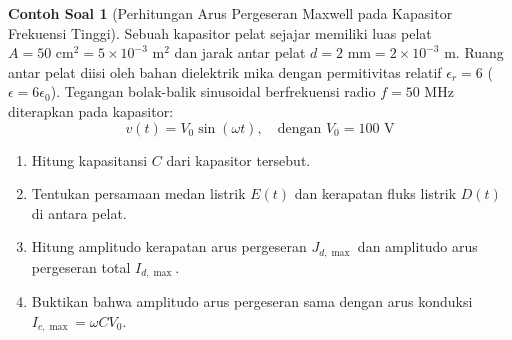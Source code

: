 \documentclass[11pt,a4paper]{article}
\theoremstyle{definition}
\newtheorem{example}{Contoh Soal}[section]
\begin{document}
\begin{example}[Perhitungan Arus Pergeseran Maxwell pada Kapasitor Frekuensi Tinggi]
Sebuah kapasitor pelat sejajar memiliki luas pelat $A = 50\text{ cm}^2 = 5 \times 10^{-3}\text{ m}^2$ dan jarak antar pelat $d = 2\text{ mm} = 2 \times 10^{-3}\text{ m}$. Ruang antar pelat diisi oleh bahan dielektrik mika dengan permitivitas relatif $\epsilon_r = 6$ ($\epsilon = 6 \epsilon_0$).
Tegangan bolak-balik sinusoidal berfrekuensi radio $f = 50\text{ MHz}$ diterapkan pada kapasitor:
\begin{equation*}
    v(t) = V_0 \sin(\omega t), \quad \text{dengan } V_0 = 100\text{ V}
\end{equation*}
\begin{enumerate}[leftmargin=*]
    \item Hitung kapasitansi $C$ dari kapasitor tersebut.
    \item Tentukan persamaan medan listrik $E(t)$ dan kerapatan fluks listrik $D(t)$ di antara pelat.
    \item Hitung amplitudo kerapatan arus pergeseran $J_{d,\max}$ dan amplitudo arus pergeseran total $I_{d,\max}$.
    \item Buktikan bahwa amplitudo arus pergeseran sama dengan arus konduksi $I_{c,\max} = \omega C V_0$.
\end{enumerate}
\end{example}
\end{document}
